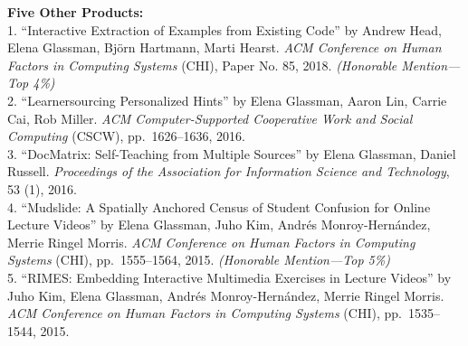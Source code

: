 \documentclass[11pt]{article}
\begin{document}
\clearpage
{\bf Five Other Products:}\\
1. ``Interactive Extraction of Examples from Existing Code'' by Andrew Head, Elena Glassman, Bj\"orn Hartmann, Marti Hearst. \emph{ACM Conference on Human Factors in Computing Systems} (CHI), Paper No. 85, 2018. {\em (Honorable Mention---Top 4\%)}\\[2pt]
2. ``Learnersourcing Personalized Hints'' by Elena Glassman, Aaron Lin, Carrie Cai, Rob Miller. \emph{ACM Computer-Supported Cooperative Work and Social Computing} (CSCW), pp.~1626--1636, 2016.\\[2pt]
3. ``DocMatrix: Self-Teaching from Multiple Sources'' by Elena Glassman, Daniel Russell. \emph{Proceedings of the Association for Information Science and Technology}, 53 (1), 2016.\\[2pt]
4. ``Mudslide: A Spatially Anchored Census of Student Confusion for Online Lecture Videos'' by Elena Glassman, Juho Kim, Andr\'es Monroy-Hern\'andez, Merrie Ringel Morris. \emph{ACM Conference on Human Factors in Computing Systems} (CHI), pp.~1555--1564, 2015. {\em (Honorable Mention---Top 5\%)}\\[2pt]
5. ``RIMES: Embedding Interactive Multimedia Exercises in Lecture Videos'' by Juho Kim, Elena Glassman, Andr\'es Monroy-Hern\'andez, Merrie Ringel Morris. \emph{ACM Conference on Human Factors in Computing Systems} (CHI), pp.~1535--1544, 2015.\\[2pt]
\end{document}
